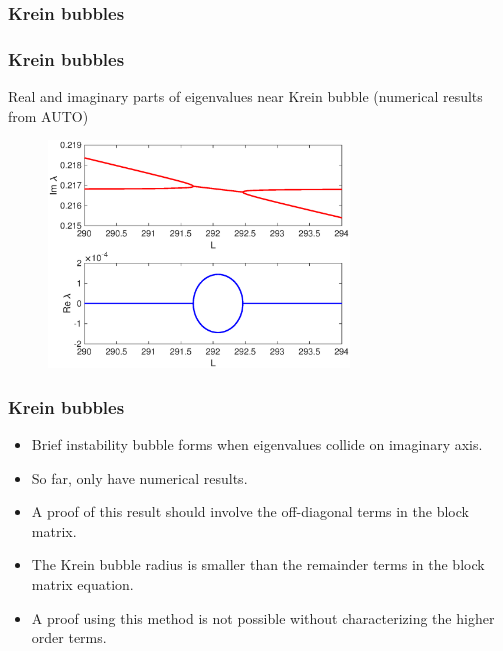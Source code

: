 \documentclass[16pt]{beamer}
\begin{document}
\begin{frame}
	\frametitle{Krein bubbles}
	\fontsize{16}{7.2}\selectfont
	\begin{center}
	\end{center}
\end{frame}

\begin{frame}
	\frametitle{Krein bubbles}
	\fontsize{16}{7.2}\selectfont
	Real and imaginary parts of eigenvalues near Krein bubble (numerical results from AUTO)
		\begin{figure}
		\begin{center}
		\includegraphics[width=8cm]{images/Kreinbubble1.eps}
		\end{center}
		\end{figure}
\end{frame}

\begin{frame}
	\frametitle{Krein bubbles}
	\fontsize{16}{7.2}\selectfont
	\begin{itemize}
		\item Brief instability bubble forms when eigenvalues collide on imaginary axis.
		\vspace{0.25cm}
		\item So far, only have numerical results.
		\vspace{0.25cm}
		\item A proof of this result should involve the off-diagonal terms in the block matrix.
		\vspace{0.25cm}
		\item The Krein bubble radius is smaller than the remainder terms in the block matrix equation.
		\vspace{0.25cm}
		\item A proof using this method is not possible without characterizing the higher order terms.
	\end{itemize}
\end{frame}
\end{document}
